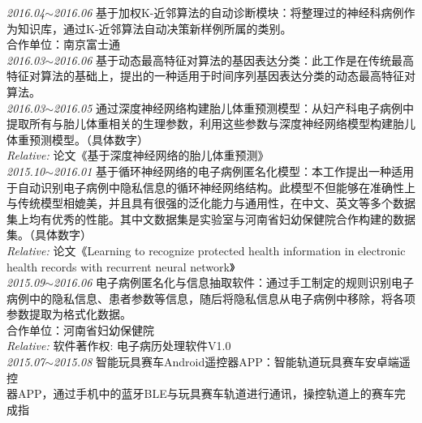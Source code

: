 \documentclass[line, margin]{res}
\newcommand{\xiaowu}{\fontsize{9pt}{15.75pt}\selectfont} %
\begin{document}
\begin{resume}
 { 
 {\sl 2016.04$\sim$2016.06} 基于加权K-近邻算法的自动诊断模块：{ 将整理过的神经科病例作\\
 为知识库，通过K-近邻算法自动决策新样例所属的类别。\\
 合作单位：南京富士通}\\
[7pt] 
 {\sl 2016.03$\sim$2016.06} 基于动态最高特征对算法的基因表达分类：{ 此工作是在传统最高\\
 特征对算法的基础上，提出的一种适用于时间序列基因表达分类的动态最高特征对\\
 算法。} \\
[7pt] 
 {\sl 2016.03$\sim$2016.05} 通过深度神经网络构建胎儿体重预测模型：{ 从妇产科电子病例中\\
 提取所有与胎儿体重相关的生理参数，利用这些参数与深度神经网络模型构建胎儿\\
 体重预测模型。（具体数字）} \\
 {\sl Relative:} {\xiaowu 论文《基于深度神经网络的胎儿体重预测》} \\
[7pt]
 {\sl 2015.10$\sim$2016.01} 基于循环神经网络的电子病例匿名化模型：{ 本工作提出一种适用\\
 于自动识别电子病例中隐私信息的循环神经网络结构。此模型不但能够在准确性上\\
 与传统模型相媲美，并且具有很强的泛化能力与通用性，在中文、英文等多个数据\\
 集上均有优秀的性能。其中文数据集是实验室与河南省妇幼保健院合作构建的数据\\
 集。（具体数字）} \\
 {\sl Relative:} {\xiaowu 论文《Learning to recognize protected health information in  electronic \\
 health records with recurrent neural network》}\\
[7pt] 
 {\sl 2015.09$\sim$2016.06} 电子病例匿名化与信息抽取软件：{ 通过手工制定的规则识别电子\\
 病例中的隐私信息、患者参数等信息，随后将隐私信息从电子病例中移除，将各项\\
 参数提取为格式化数据。\\
 合作单位：河南省妇幼保健院 } \\
 {\sl Relative:} {\xiaowu 软件著作权: 电子病历处理软件V1.0} \\
[7pt]
 {\sl 2015.07$\sim$2015.08} 智能玩具赛车Android遥控器APP：{ 智能轨道玩具赛车安卓端遥控\\
 器APP，通过手机中的蓝牙BLE与玩具赛车轨道进行通讯，操控轨道上的赛车完成指\\
}}
\end{resume}
\end{document}
